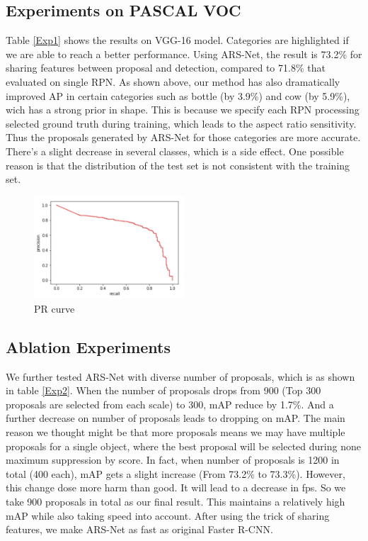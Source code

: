 \documentclass[10pt,twocolumn,letterpaper]{article}
\begin{document}
\subsection{Experiments on PASCAL VOC}
\indent{} Table \ref{Exp1} shows the results on VGG-16\cite{vgg} model. Categories are highlighted if we are able to reach a better performance. Using ARS-Net, the result is 73.2\% for sharing features between proposal and detection, compared to 71.8\% that evaluated on single RPN. As shown above, our method has also dramatically improved AP in certain categories such as bottle (by 3.9\%) and cow (by 5.9\%), wich has a strong prior in shape. This is because we specify each RPN processing selected ground truth during training, which leads to the aspect ratio sensitivity. Thus the proposals generated by ARS-Net for those categories are more accurate. There's a slight decrease in several classes, which is a side effect. One possible reason is that the distribution of the test set is not consistent with the training set.
    \begin{figure}[!htb]
    \includegraphics[width= 0.5\textwidth]{pic/precision_per_recall.png}
    \caption{PR curve}
    \label{prcurve}
    \end{figure}
    
\subsection{Ablation Experiments}
We further tested ARS-Net with diverse number of proposals, which is as shown in table \ref{Exp2}. When the number of proposals drops from 900 (Top 300 proposals are selected from each scale) to 300, mAP reduce by 1.7\%. And a further decrease on number of proposals leads to dropping on mAP. The main reason we thought might be that more proposals means we may have multiple proposals for a single object, where the best proposal will be selected during none maximum suppression by score. In fact, when number of proposals is 1200 in total (400 each), mAP gets a slight increase (From 73.2\% to 73.3\%). However, this change dose more harm than good. It will lead to a decrease in fps. So we take 900 proposals in total as our final result. This maintains a relatively high mAP while also taking speed into account. After using the trick of sharing features, we make ARS-Net as fast as original Faster R-CNN.
\end{document}
